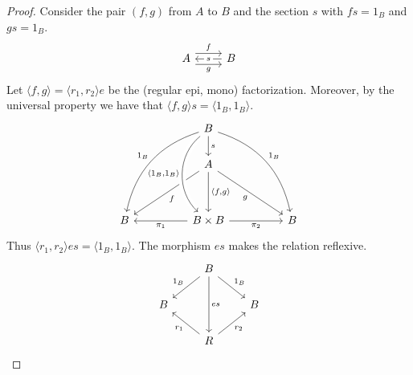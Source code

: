 \begin{subbox}{}
    \begin{proof}
        Consider the pair $(f,g)$ from $A$ to $B$ and the section $s$ with $fs=1_B$ and $gs=1_B$.
\[
\begin{tikzcd}
    A \arrow[r, "f", shift left=2] \arrow[r, "g"', shift right=2] & B \arrow[l, "s" description]
    \end{tikzcd}
\]
Let $\langle f,g \rangle = \langle r_1,r_2\rangle e$ be the (regular epi, mono) factorization. Moreover, by the universal property we have that $\langle f,g \rangle s = \langle 1_B,1_B \rangle$.
\[
\begin{tikzcd}
    &  & B \arrow[d, "s"] \arrow[llddd, "1_B"', bend right] \arrow[rrddd, "1_B", bend left] &  &   \\
    &  & A \arrow[dd, "{\langle f,g \rangle}"] \arrow[lldd, "f"] \arrow[rrdd, "g"']                                                                  &  &   \\
    &  &                                                                                                                                             &  &   \\
  B &  & B \times B \arrow[rr, "\pi_2"'] \arrow[ll, "\pi_1"] \arrow[from=uuu, "{\langle 1_B,1_B \rangle}"', bend right=49, crossing over]                                                                                         &  & B
  \end{tikzcd}
\]
Thus $\langle r_1,r_2\rangle es = \langle 1_B,1_B \rangle$. The morphism $es$ makes the relation reflexive.
\[
\begin{tikzcd}
    & B \arrow[dd, "es"] \arrow[ld, "1_B"'] \arrow[rd, "1_B"] &   \\
  B &                                                         & B \\
    & R \arrow[lu, "r_1"] \arrow[ru, "r_2"']                  &  
  \end{tikzcd}
\]
    \end{proof}
\end{subbox}

